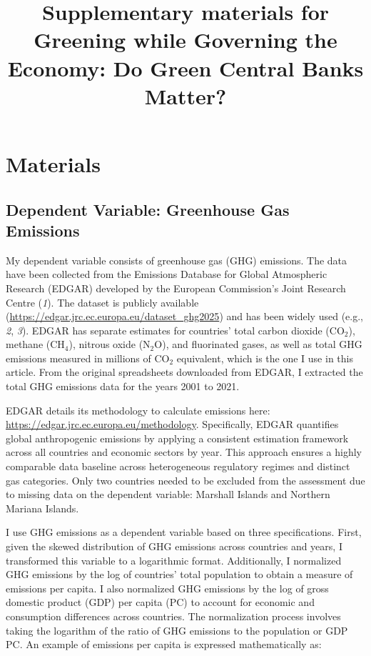\documentclass[
  12pt,
  letterpaper,
]{article}
\title{Supplementary materials for\\
Greening while Governing the Economy: Do Green Central Banks Matter?}
\author{}
\date{}
\renewcommand*\contentsname{Table of contents}
\newcommand\contentsname{Table of contents}
\begin{document}
\maketitle

\renewcommand*\contentsname{Table of Contents}
{
\setcounter{tocdepth}{3}
\tableofcontents
}

\newpage{}

\section{Materials}\label{materials}

\subsection{Dependent Variable: Greenhouse Gas
Emissions}\label{dependent-variable-greenhouse-gas-emissions}

My dependent variable consists of greenhouse gas (GHG) emissions. The
data have been collected from the Emissions Database for Global
Atmospheric Research (EDGAR) developed by the European Commission's
Joint Research Centre (\emph{1}). The dataset is publicly available
(\url{https://edgar.jrc.ec.europa.eu/dataset_ghg2025}) and has been
widely used (e.g., \emph{2}, \emph{3}). EDGAR has separate estimates for
countries' total carbon dioxide (\(\text{CO}_2\)), methane
(\(\text{CH}_4\)), nitrous oxide (\(\text{N}_2\text{O}\)), and
fluorinated gases, as well as total GHG emissions measured in millions
of \(\text{CO}_2\) equivalent, which is the one I use in this article.
From the original spreadsheets downloaded from EDGAR, I extracted the
total GHG emissions data for the years 2001 to 2021.

EDGAR details its methodology to calculate emissions here:
\url{https://edgar.jrc.ec.europa.eu/methodology}. Specifically, EDGAR
quantifies global anthropogenic emissions by applying a consistent
estimation framework across all countries and economic sectors by year.
This approach ensures a highly comparable data baseline across
heterogeneous regulatory regimes and distinct gas categories. Only two
countries needed to be excluded from the assessment due to missing data
on the dependent variable: Marshall Islands and Northern Mariana
Islands.

I use GHG emissions as a dependent variable based on three
specifications. First, given the skewed distribution of GHG emissions
across countries and years, I transformed this variable to a logarithmic
format. Additionally, I normalized GHG emissions by the log of
countries' total population to obtain a measure of emissions per capita.
I also normalized GHG emissions by the log of gross domestic product
(GDP) per capita (PC) to account for economic and consumption
differences across countries. The normalization process involves taking
the logarithm of the ratio of GHG emissions to the population or GDP PC.
An example of emissions per capita is expressed mathematically as:
\end{document}
